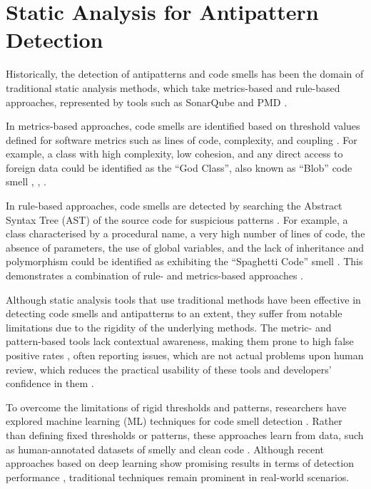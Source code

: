 \section{Static Analysis for Antipattern Detection}\label{sec:staticAnalysis}

Historically, the detection of antipatterns and code smells has been the domain of traditional static analysis methods, which take metrics-based and rule-based approaches, represented by tools such as SonarQube  and PMD . 

In metrics-based approaches, code smells are identified based on threshold values defined for software metrics such as lines of code, complexity, and coupling . For example, a class with high complexity, low cohesion, and any direct access to foreign data could be identified as the “God Class”, also known as “Blob” code smell , , .

In rule-based approaches, code smells are detected by searching the Abstract Syntax Tree (AST) of the source code for suspicious patterns . For example, a class characterised by a procedural name, a very high number of lines of code, the absence of parameters, the use of global variables, and the lack of inheritance and polymorphism could be identified as exhibiting the “Spaghetti Code” smell . This demonstrates a combination of rule- and metrics-based approaches .

Although static analysis tools that use traditional methods have been effective in detecting code smells and antipatterns to an extent, they suffer from notable limitations due to the rigidity of the underlying methods. The metric- and pattern-based tools lack contextual awareness, making them prone to high false positive rates , often reporting issues, which are not actual problems upon human review, which reduces the practical usability of these tools and developers' confidence in them .

To overcome the limitations of rigid thresholds and patterns, researchers have explored machine learning (ML) techniques for code smell detection . Rather than defining fixed thresholds or patterns, these approaches learn from data, such as human-annotated datasets of smelly and clean code . Although recent approaches based on deep learning show promising results in terms of detection performance , traditional techniques remain prominent in real-world scenarios.


